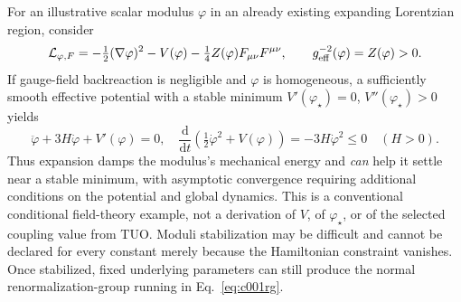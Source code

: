\documentclass[11pt,a4paper]{article}
\newcommand{\dd}{\mathrm{d}}
\theoremstyle{tmon}
\theoremstyle{definition}
\begin{document}
For an illustrative scalar modulus $\varphi$ in an already existing expanding Lorentzian region, consider
\[
\mathcal L_{\varphi,F}=-\tfrac12(\nabla\varphi)^2-V(\varphi)-\tfrac14 Z(\varphi)F_{\mu\nu}F^{\mu\nu},
\qquad g_{\rm eff}^{-2}(\varphi)=Z(\varphi)>0.
\]
If gauge-field backreaction is negligible and $\varphi$ is homogeneous, a sufficiently smooth effective potential with a stable minimum $V'(\varphi_\star)=0$, $V''(\varphi_\star)>0$ yields
\begin{equation}\label{eq:c001modulus}
\ddot\varphi+3H\dot\varphi+V'(\varphi)=0,\quad
\frac{\dd}{\dd t}\left(\tfrac12\dot\varphi^2+V(\varphi)\right)=-3H\dot\varphi^2\le0\quad(H>0).
\end{equation}
Thus expansion damps the modulus's mechanical energy and \emph{can} help it settle near a stable minimum, with asymptotic convergence requiring additional conditions on the potential and global dynamics. This is a conventional conditional field-theory example, not a derivation of $V$, of $\varphi_\star$, or of the selected coupling value from TUO. Moduli stabilization may be difficult and cannot be declared for every constant merely because the Hamiltonian constraint vanishes. Once stabilized, fixed underlying parameters can still produce the normal renormalization-group running in Eq.~\eqref{eq:c001rg}.
\end{document}
